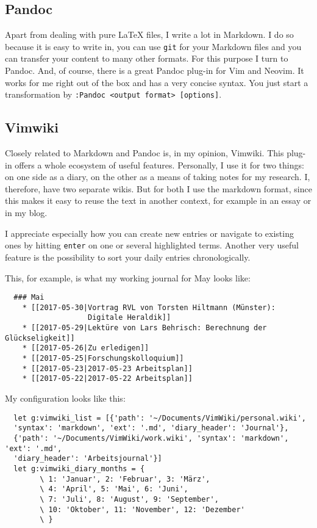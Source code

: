 \documentclass[DIV=calc, a4paper, fontsize=12pt, headings=normal, parskip=half]{scrartcl}
\begin{document}
\subsection{Pandoc}\label{pandoc}

Apart from dealing with pure LaTeX files, I write a lot in Markdown. I
do so because it is easy to write in, you can use \texttt{git} for your
Markdown files and you can transfer your content to many other formats.
For this purpose I turn to Pandoc. And, of course, there is a great
Pandoc plug-in for Vim and Neovim. It works for me right out of the box
and has a very concise syntax. You just start a transformation by
\texttt{:Pandoc\ \textless{}output\ format\textgreater{}\ {[}options{]}}.

\subsection{Vimwiki}\label{vimwiki}

Closely related to Markdown and Pandoc is, in my opinion, Vimwiki. This
plug-in offers a whole ecosystem of useful features. Personally, I use
it for two things: on one side as a diary, on the other as a means of
taking notes for my research. I, therefore, have two separate wikis. But
for both I use the markdown format, since this makes it easy to reuse
the text in another context, for example in an essay or in my blog.

I appreciate especially how you can create new entries or navigate to
existing ones by hitting \texttt{enter} on one or several highlighted
terms. Another very useful feature is the possibility to sort your daily
entries chronologically.

This, for example, is what my working journal for May looks like:

\begin{singlespace}
  \begin{verbatim}
  ### Mai
    * [[2017-05-30|Vortrag RVL von Torsten Hiltmann (Münster):
                   Digitale Heraldik]]
    * [[2017-05-29|Lektüre von Lars Behrisch: Berechnung der Glückseligkeit]]
    * [[2017-05-26|Zu erledigen]]
    * [[2017-05-25|Forschungskolloquium]]
    * [[2017-05-23|2017-05-23 Arbeitsplan]]
    * [[2017-05-22|2017-05-22 Arbeitsplan]]
  \end{verbatim}
\end{singlespace}

My configuration looks like this:

\begin{singlespace}
  \begin{verbatim}
  let g:vimwiki_list = [{'path': '~/Documents/VimWiki/personal.wiki',
  'syntax': 'markdown', 'ext': '.md', 'diary_header': 'Journal'},
  {'path': '~/Documents/VimWiki/work.wiki', 'syntax': 'markdown', 'ext': '.md',
  'diary_header': 'Arbeitsjournal'}]
  let g:vimwiki_diary_months = {
        \ 1: 'Januar', 2: 'Februar', 3: 'März',
        \ 4: 'April', 5: 'Mai', 6: 'Juni',
        \ 7: 'Juli', 8: 'August', 9: 'September',
        \ 10: 'Oktober', 11: 'November', 12: 'Dezember'
        \ }
  \end{verbatim}
\end{singlespace}
\end{document}
